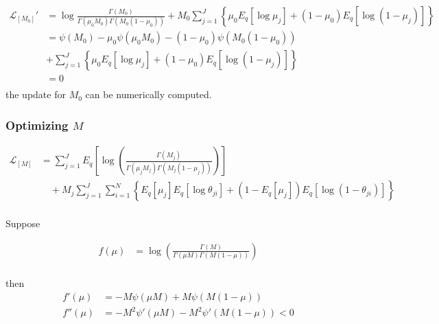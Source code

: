 \documentclass[11pt,reqno]{amsart}
\begin{document}
\begin{equation}
\begin{split}
\label{M_0}
\mathcal{L}_{[M_0]}' 
&= \log \frac{ \Gamma(M_0) } { \Gamma(\mu_0 M_0) \Gamma(M_0 (1-\mu_0))}  
+ M_0 \sum_{j=1}^{J} \left\lbrace \mu_0E_q  \left[ \log \mu_j \right] + ( 1 - \mu_0) E_q  \left[ \log (1 - \mu_j)\right]\right\rbrace  \\
&= \psi(M_0)  - \mu_0 \psi(\mu_0 M_0) - (1-\mu_0) \psi(M_0 (1-\mu_0))  \\
\quad &+ \sum_{j=1}^{J} \left\lbrace \mu_0E_q  \left[ \log \mu_j \right] + ( 1 - \mu_0) E_q  \left[ \log (1 - \mu_j)\right]\right\rbrace \\
&=0 \\
\end{split}
\end{equation}
the update for $ M_0 $ can be numerically computed.


\subsubsection{Optimizing $ M $}
\begin{equation}
\begin{split}
\label{M}
\mathcal{L}_{{[M]}} 
&= \sum_{j=1}^{J} E_q  \left[ \log \left( \frac{ \Gamma(M_j) } { \Gamma(\mu_j M_j) \Gamma(M_j (1-\mu_j)) }\right) \right] \\ 
&\quad + M_j \sum_{j=1}^{J} \sum_{i=1}^{N} \left\lbrace E_q \left[ \mu_j \right] E_q \left[ \log \theta_{ji} \right] + \left( 1 - E_q\left[ \mu_j \right]  \right) E_q\left[ \log \left( 1 - \theta_{ji}\right) \right] \right\rbrace \\
\end{split}
\end{equation}

Suppose

\begin{equation}
\begin{split}
f(\mu) &= \log\left( \frac{\Gamma(M)}{\Gamma(\mu M) \Gamma(M (1-\mu ))}\right) \nonumber \\
\end{split}
\end{equation}

then
\begin{align}
f'(\mu) &= -M \psi (\mu M) + M \psi(M (1-\mu )) \nonumber \\
f''(\mu) &= -M^2 \psi ' (\mu M) - M^2 \psi '(M (1-\mu )) <0 \nonumber \\
\end{align}
\end{document}

